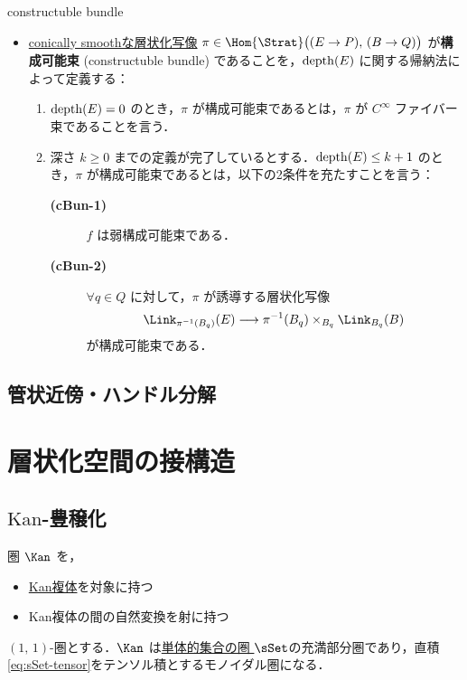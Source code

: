 \documentclass[TQFT_main]{subfiles}
\begin{document}
\begin{mydef}[label=def:cbl,breakable]{constructuble bundle}
\begin{itemize}
        \item  \hyperref[def:c-smooth-map]{conically smoothな層状化写像} $\pi \in \Hom{\Strat}\bigl( (E \to P),\, (B \to Q) \bigr)$ が\textbf{構成可能束} (constructuble bundle) であることを，\hyperref[def:dim-depth]{$\operatorname{depth} (E)$} に関する帰納法によって定義する：
        \begin{enumerate}
            \item $\operatorname{depth} (E) = 0$ のとき，$\pi$ が構成可能束であるとは，$\pi$ が $C^\infty$ ファイバー束であることを言う．
            \item 深さ $k \ge 0$ までの定義が完了しているとする．$\operatorname{depth}(E) \le k+1$ のとき，$\pi$ が構成可能束であるとは，以下の2条件を充たすことを言う：
            \begin{description}
                \item[\textbf{(cBun-1)}] $f$ は弱構成可能束である．
                \item[\textbf{(cBun-2)}] $\forall q \in Q$ に対して，$\pi$ が誘導する層状化写像
                \begin{align}
                    \Link_{\pi^{-1}(B_q)} (E) \lto \pi^{-1}(B_q) \times_{B_q} \Link_{B_q} (B)
                \end{align}
                が構成可能束である．
            \end{description}
        \end{enumerate}
    \end{itemize}
\end{mydef}


\subsection{管状近傍・ハンドル分解}

\section{層状化空間の接構造}

\subsection{$\mathrm{Kan}$-豊穣化}

圏 $\Kan$ を，
\begin{itemize}
    \item \hyperref[def:KanCplx]{Kan複体}を対象に持つ
    \item Kan複体の間の自然変換を射に持つ
\end{itemize}
$(1,\, 1)$-圏とする．$\Kan$ は\hyperref[def:SimpSet]{単体的集合の圏 $\sSet$}の充満部分圏であり，直積\eqref{eq:sSet-tensor}をテンソル積とするモノイダル圏になる．
\end{document}
